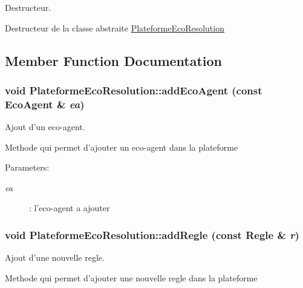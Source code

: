 Destructeur. 

Destructeur de la classe abstraite \hyperlink{classPlateformeEcoResolution}{PlateformeEcoResolution} 

\subsection{Member Function Documentation}
\hypertarget{classPlateformeEcoResolution_45d2074749341698f24086b77f3f3edd}{
\subsubsection[{addEcoAgent}]{\setlength{\rightskip}{0pt plus 5cm}void PlateformeEcoResolution::addEcoAgent (const {\bf EcoAgent} \& {\em ea})}}
\label{classPlateformeEcoResolution_45d2074749341698f24086b77f3f3edd}


Ajout d'un eco-agent. 

Methode qui permet d'ajouter un eco-agent dans la plateforme

\begin{Desc}
\item[Parameters:]
\begin{description}
\item[{\em ea}]: l'eco-agent a ajouter \end{description}
\end{Desc}
\hypertarget{classPlateformeEcoResolution_4b6382c212be5a06de556de5aa8f9e6a}{
\subsubsection[{addRegle}]{\setlength{\rightskip}{0pt plus 5cm}void PlateformeEcoResolution::addRegle (const {\bf Regle} \& {\em r})}}
\label{classPlateformeEcoResolution_4b6382c212be5a06de556de5aa8f9e6a}


Ajout d'une nouvelle regle. 

Methode qui permet d'ajouter une nouvelle regle dans la plateforme


